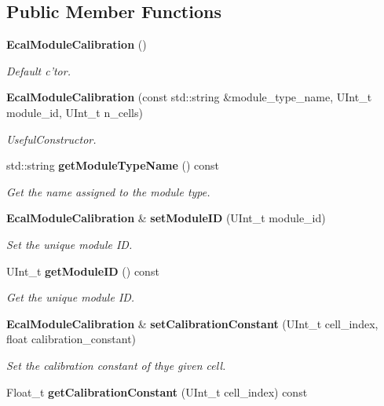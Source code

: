 \subsection*{Public Member Functions}
\begin{DoxyCompactItemize}
\item 
{\bf Ecal\-Module\-Calibration} ()\label{classCALICE_1_1EcalModuleCalibration_ae630cd2d19428408a0318136f4094831}

\begin{DoxyCompactList}\small\item\em Default c'tor. \end{DoxyCompactList}\item 
{\bf Ecal\-Module\-Calibration} (const std\-::string \&module\-\_\-type\-\_\-name, U\-Int\-\_\-t module\-\_\-id, U\-Int\-\_\-t n\-\_\-cells)\label{classCALICE_1_1EcalModuleCalibration_ac75e6361c5f11223a22cf1da6119b763}

\begin{DoxyCompactList}\small\item\em Useful\-Constructor. \end{DoxyCompactList}\item 
std\-::string {\bf get\-Module\-Type\-Name} () const 
\begin{DoxyCompactList}\small\item\em Get the name assigned to the module type. \end{DoxyCompactList}\item 
{\bf Ecal\-Module\-Calibration} \& {\bf set\-Module\-I\-D} (U\-Int\-\_\-t module\-\_\-id)
\begin{DoxyCompactList}\small\item\em Set the unique module I\-D. \end{DoxyCompactList}\item 
U\-Int\-\_\-t {\bf get\-Module\-I\-D} () const 
\begin{DoxyCompactList}\small\item\em Get the unique module I\-D. \end{DoxyCompactList}\item 
{\bf Ecal\-Module\-Calibration} \& {\bf set\-Calibration\-Constant} (U\-Int\-\_\-t cell\-\_\-index, float calibration\-\_\-constant)
\begin{DoxyCompactList}\small\item\em Set the calibration constant of thye given cell. \end{DoxyCompactList}\item 
Float\-\_\-t {\bfseries get\-Calibration\-Constant} (U\-Int\-\_\-t cell\-\_\-index) const \label{classCALICE_1_1EcalModuleCalibration_a4bd0b7b4240be5983283941a0c00995d}


\end{DoxyCompactItemize}
